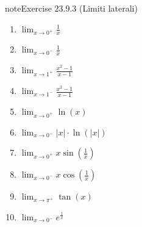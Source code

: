 \documentclass[letterpaper,10pt,italian]{jupyterBook}
\begin{document}
\begin{sphinxadmonition}{note}{Exercise 23.9.3 (Limiti laterali)}


\begin{enumerate}
%
\item {} 
\sphinxAtStartPar
\(\lim_{x \to 0^+} \frac{1}{x}\)

\item {} 
\sphinxAtStartPar
\(\lim_{x \to 0^-} \frac{1}{x}\)

\item {} 
\sphinxAtStartPar
\(\lim_{x \to 1^+} \frac{x^2 - 1}{x - 1}\)

\item {} 
\sphinxAtStartPar
\(\lim_{x \to 1^-} \frac{x^2 - 1}{x - 1}\)

\item {} 
\sphinxAtStartPar
\(\lim_{x \to 0^+} \ln(x)\)

\item {} 
\sphinxAtStartPar
\(\lim_{x \to 0^-} |x| \cdot \ln(|x|)\)

\item {} 
\sphinxAtStartPar
\(\lim_{x \to 0^+} x \sin\left(\frac{1}{x}\right)\)

\item {} 
\sphinxAtStartPar
\(\lim_{x \to 0^-} x \cos\left(\frac{1}{x}\right)\)

\item {} 
\sphinxAtStartPar
\(\lim_{x \to \pi^+} \tan(x)\)

\item {} 
\sphinxAtStartPar
\(\lim_{x \to 0^-} e^{\frac{1}{x}}\)

\end{enumerate}
\end{sphinxadmonition}
 \label{exercise:ch/infinitesimal_calculus/analysis-problems-exercise-3}
\end{document}
